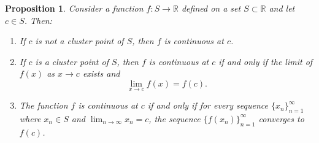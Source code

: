 \documentclass{article}
\newtheorem{prop}[theorem]{Proposition}
\theoremstyle{definition}
\begin{document}
\begin{prop}
    Consider a function \( f: S \rightarrow \mathbb{R} \) defined on a set \( S \subset \mathbb{R} \) and let \( c \in S \). Then:

\begin{enumerate}
    \item If \( c \) is not a cluster point of \( S \), then \( f \) is continuous at \( c \).
    \item If \( c \) is a cluster point of \( S \), then \( f \) is continuous at \( c \) if and only if the limit of \( f(x) \) as \( x \rightarrow c \) exists and
    \[
    \lim_{x \rightarrow c} f(x) = f(c).
    \]
    \item The function \( f \) is continuous at \( c \) if and only if for every sequence \( \{x_n\}_{n=1}^{\infty} \) where \( x_n \in S \) and \( \lim_{n \rightarrow \infty} x_n = c \), the sequence \( \{f(x_n)\}_{n=1}^{\infty} \) converges to \( f(c) \).
\end{enumerate}
\end{prop}
\end{document}
